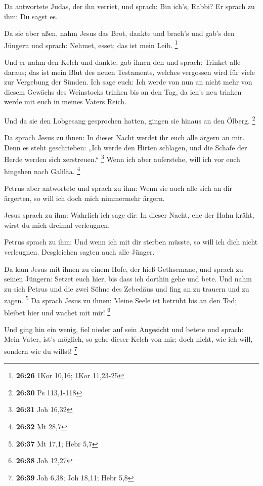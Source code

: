  Da antwortete Judas, der ihn verriet, und sprach: Bin
ich's, Rabbi? Er sprach zu ihm: Du sagst es.

 Da sie aber aßen, nahm Jesus das Brot, dankte und brach's
und gab's den Jüngern und sprach: Nehmet, esset; das ist mein Leib.
\footnote{\textbf{26:26} 1Kor 10,16; 1Kor 11,23-25}

 Und er nahm den Kelch und dankte, gab ihnen den und
sprach: Trinket alle daraus;  das ist mein Blut des neuen
Testaments, welches vergossen wird für viele zur Vergebung der Sünden.
 Ich sage euch: Ich werde von nun an nicht mehr von diesem
Gewächs des Weinstocks trinken bis an den Tag, da ich's neu trinken
werde mit euch in meines Vaters Reich.

 Und da sie den Lobgesang gesprochen hatten, gingen sie
hinaus an den Ölberg. \footnote{\textbf{26:30} Ps 113,1-118}

 Da sprach Jesus zu ihnen: In dieser Nacht werdet ihr euch
alle ärgern an mir. Denn es steht geschrieben: „Ich werde den Hirten
schlagen, und die Schafe der Herde werden sich zerstreuen.`` \footnote{\textbf{26:31}
  Joh 16,32}  Wenn ich aber auferstehe, will ich vor euch
hingehen nach Galiläa. \footnote{\textbf{26:32} Mt 28,7}

 Petrus aber antwortete und sprach zu ihm: Wenn sie auch
alle sich an dir ärgerten, so will ich doch mich nimmermehr ärgern.

 Jesus sprach zu ihm: Wahrlich ich sage dir: In dieser
Nacht, ehe der Hahn kräht, wirst du mich dreimal verleugnen.

 Petrus sprach zu ihm: Und wenn ich mit dir sterben müsste,
so will ich dich nicht verleugnen. Desgleichen sagten auch alle Jünger.

 Da kam Jesus mit ihnen zu einem Hofe, der hieß Gethsemane,
und sprach zu seinen Jüngern: Setzet euch hier, bis dass ich dorthin
gehe und bete.  Und nahm zu sich Petrus und die zwei Söhne
des Zebedäus und fing an zu trauern und zu zagen. \footnote{\textbf{26:37}
  Mt 17,1; Hebr 5,7}  Da sprach Jesus zu ihnen: Meine Seele
ist betrübt bis an den Tod; bleibet hier und wachet mit mir! \footnote{\textbf{26:38}
  Joh 12,27}

 Und ging hin ein wenig, fiel nieder auf sein Angesicht und
betete und sprach: Mein Vater, ist's möglich, so gehe dieser Kelch von
mir; doch nicht, wie ich will, sondern wie du willst! \footnote{\textbf{26:39}
  Joh 6,38; Joh 18,11; Hebr 5,8}

